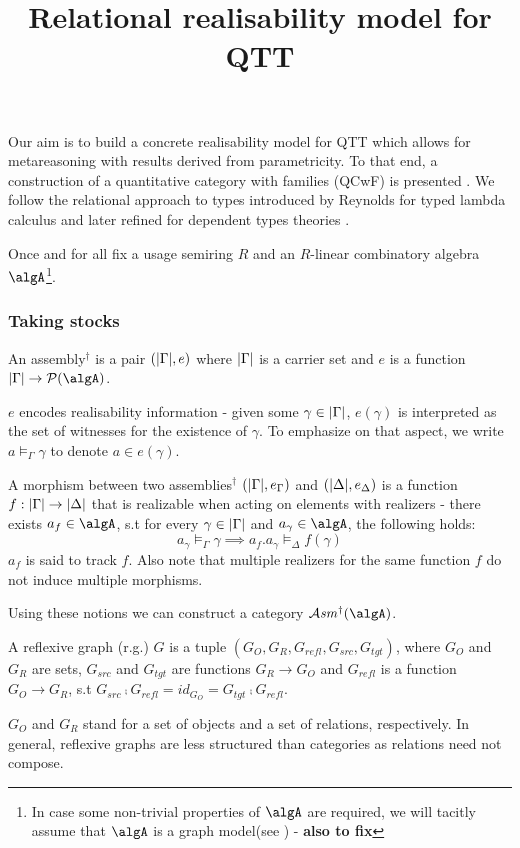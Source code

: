 \documentclass[12pt,a4paper]{article}
\title{\vspace{-5em} Relational realisability model for QTT}
\date{\vspace{-3em}}
\def\cAsm{\mathcal{A}\mathit{sm}^\dagger}
\def\src{_{src}}\alwaysmath{src}
\def\rfl{_{refl}}\alwaysmath{rfl}
\def\tgt{_{tgt}}\alwaysmath{tgt}
\renewcommand{\O}{_{O}}
\newcommand{\R}{\ensuremath{_{R}}}
\begin{document}
\maketitle

Our aim is to build a concrete realisability model for QTT which allows for metareasoning with results derived from parametricity. To that end, a construction of a quantitative category with families (QCwF) is presented \cite{Atkey2018}. We follow the relational approach to types introduced by Reynolds for typed lambda calculus \cite{Ma1992} and later refined for dependent types theories \cite{Atkey2014a}.


Once and for all fix a usage semiring $R$ and an $R$-linear combinatory algebra $\algA$\footnote{In case some non-trivial properties of $\algA$ are required, we will tacitly assume that $\algA$ is a graph model(see \cite{fill}) - \textbf{also to fix}}.

\subsubsection*{Taking stocks}
\begin{definition}
  An assembly$^\dagger$ \Gamma is a pair $(|\Gamma|, e)$ where $|\Gamma|$ is a carrier set and  $e$ is a function $\carr\Gamma \to \pow(\algA)$.
\end{definition}

$e$ encodes realisability information - given some $\gamma \in |\Gamma|$, $e(\gamma)$ is interpreted as the set of witnesses for the existence of $\gamma$. To emphasize on that aspect, we write $a \vDash_\Gamma \gamma$ to denote $a \in e(\gamma)$.

A morphism between two assemblies$^\dagger$ $(|\Gamma|, e_\Gamma)$ and $(|\Delta|, e_\Delta)$ is a function $f : |\Gamma| \to |\Delta|$ that is realizable when acting on elements with realizers - there exists $a_f \in \algA$, s.t for every $\gamma \in |\Gamma|$ and $a_\gamma \in \algA$, the following holds:
$$ a_\gamma \vDash_\Gamma \gamma \implies a_f . a_\gamma \vDash_\Delta f(\gamma) $$
$a_f$ is said to track $f$. Also note that multiple realizers for the same function $f$ do not induce multiple morphisms.

Using these notions we can construct a category $\cAsm(\algA)$.

\begin{definition}
  \label{def:refl-graph}
  A reflexive graph (r.g.) $G$ is a tuple $(G\O, G\R, G\rfl, G\src, G\tgt)$, where $G_O$ and $G_R$ are sets, $G\src$ and $G\tgt$ are functions $G\R \to G\O$ and $G\rfl$ is a function $G\O \to G\R$, s.t $G\src \comp G\rfl = id_{G\O} = G\tgt \comp G\rfl$.
\end{definition}
$G\O$ and $G\R$ stand for a set of objects and a set of relations, respectively. In general, reflexive graphs are less structured than categories as relations need not compose.
\end{document}
